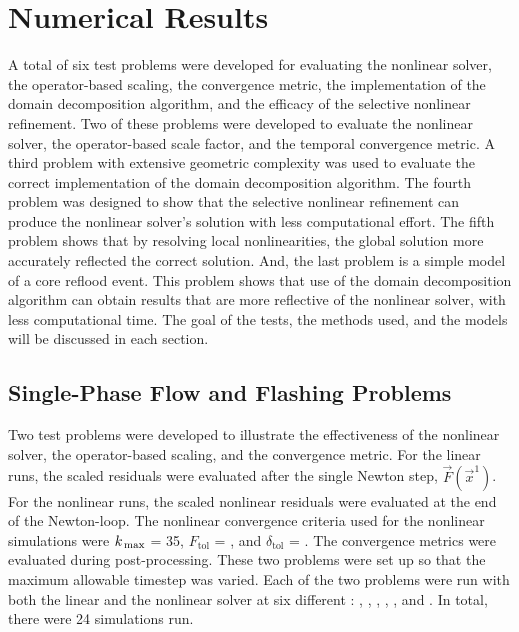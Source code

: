 \chapter{Numerical Results}
\label{chap:results}

A total of six test problems were developed for evaluating the nonlinear solver, the operator-based scaling, the convergence metric, the implementation of the domain decomposition algorithm, and the efficacy of the selective nonlinear refinement.
Two of these problems were developed to evaluate the nonlinear solver, the operator-based scale factor, and the temporal convergence metric.
A third problem with extensive geometric complexity was used to evaluate the correct implementation of the domain decomposition algorithm.
The fourth problem was designed to show that the selective nonlinear refinement can produce the nonlinear solver's solution with less computational effort.
The fifth problem shows that by resolving local nonlinearities, the global solution more accurately reflected the correct solution.
And, the last problem is a simple model of a core reflood event.
This problem shows that use of the domain decomposition algorithm can obtain results that are more reflective of the nonlinear solver, with less computational time.
The goal of the tests, the methods used, and the models will be discussed in each section.

\section{Single-Phase Flow and Flashing Problems}
\label{sect:single_phase_and_flashing}

Two test problems were developed to illustrate the effectiveness of the nonlinear solver, the operator-based scaling, and the convergence metric.
For the linear runs, the scaled residuals were evaluated after the single Newton step, $\vec{F}(\vec{x}^{1})$.
For the nonlinear runs, the scaled nonlinear residuals were evaluated at the end of the Newton-loop.
The nonlinear convergence criteria used for the nonlinear simulations were $\kmax$ = 35, $F_{\text{tol}}$ = , and $\delta_{\text{tol}}$ = .
The convergence metrics were evaluated during post-processing.
These two problems were set up so that the maximum allowable timestep was varied.
Each of the two problems were run with both the linear and the nonlinear solver at six different \dtmax{}:  , , , , , and .
In total, there were 24 simulations run.

